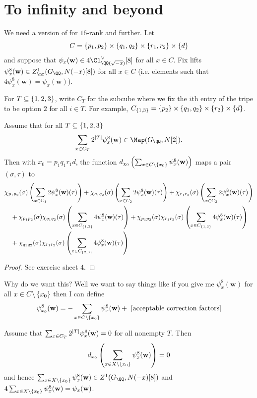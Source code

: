 \documentclass{lecturenotes}
\newcommand{\bw}{\mathbf{w}}
\numberwithin{equation}{section}
\begin{document}
\section{To infinity and beyond}
We need a version of  for $16$-rank and further.  Let 
\[C=\left\{{p_1,p_2}\right\}\times\left\{{q_1,q_2}\right\}\times \left\{{r_1,r_2}\right\}\times \left\{{d}\right\}\]
and suppose that $\psi_x(\bw)\in 4\Cl_{\QQ(\sqrt{-x})}^\vee[8]$ for all $x\in C$.  Fix lifts $\psi_x^8(\bw)\in Z^1_\nr(G_\QQ, N(-x)[8])$ for all $x\in C$ (i.e. elements such that $4\psi_x^8(\bw)=\psi_x(\bw)$).


For $T\subseteq \left\{{1,2,3}\right\}$, write $C_T$ for the subcube where we fix the $i$th entry of the tripe to be option $2$ for all $i\in T$.  For example, $C_{\left\{{1,3}\right\}}=\left\{{p_2}\right\}\times \left\{{q_1,q_2}\right\}\times \left\{{r_2}\right\}\times \left\{{d}\right\}$.
\begin{theorem}\label{thm:highersums}
Assume that for all $T\subseteq \left\{{1,2,3}\right\}$
\[\sum_{x\in C_T}2^{\abs{T}}\psi_x^8(\bw)\in \Map(G_\QQ,N[2]).\]  
Then with $x_0=p_1q_1r_1d$, the function $d_{\chi_0}\braces{\sum_{x\in C\backslash\set{x_0}}\psi_x^8(\bw)}$ maps a pair $(\sigma,\tau)$ to
\begin{align*}
    &\chi_{p_1p_2}(\sigma)\braces{\sum_{x\in C_1}2\psi_x^8(\bw)(\tau)}
    +\chi_{q_1q_2}(\sigma)\braces{\sum_{x\in C_2}2\psi_x^8(\bw)(\tau)}
    +\chi_{r_1r_2}(\sigma)\braces{\sum_{x\in C_3}2\psi_x^8(\bw)(\tau)}
    \\&\quad+\chi_{p_1p_2}(\sigma)\chi_{q_1q_2}(\sigma)\braces{\sum_{x\in C_{\set{1,2}}}4\psi_x^8(\bw)(\tau)}
    +\chi_{p_1p_2}(\sigma)\chi_{r_1r_2}(\sigma)\braces{\sum_{x\in C_{\set{1,3}}}4\psi_x^8(\bw)(\tau)}
    \\&\quad+\chi_{q_1q_2}(\sigma)\chi_{r_1r_2}(\sigma)\braces{\sum_{x\in C_{\set{2,3}}}4\psi_x^8(\bw)(\tau)}
\end{align*}
\end{theorem}
\begin{proof}
    See exercise sheet 4.
\end{proof}
Why do we want this?  Well we want to say things like if you give me $\psi_x^8(\bw)$ for all $x\in C\backslash\left\{{x_0}\right\}$ then I can define 
\[\psi_{x_0}^8(\bw)=-\sum_{x\in C\backslash\set{x_0}}\psi_x^8(\bw)+\textnormal{ [acceptable correction factors]}\]
\begin{corollary}\label{cor:1}
    Assume that $\sum_{x\in C_T}2^{\abs{T}}\psi_x^8(\bw)=0$ for all nonempty $T$.  Then 
    \[d_{x_0}\braces{\sum_{x\in X\backslash\set{x_0}}\psi_x^8(\bw)}=0\]
    and hence $\sum_{x\in X\backslash\set{x_0}}\psi_x^8(\bw)\in Z^1(G_\QQ,N(-x)[8])$ and $4\sum_{x\in X\backslash\set{x_0}}\psi_x^8(\bw)=\psi_x(\bw)$.
\end{corollary}
\end{document}
